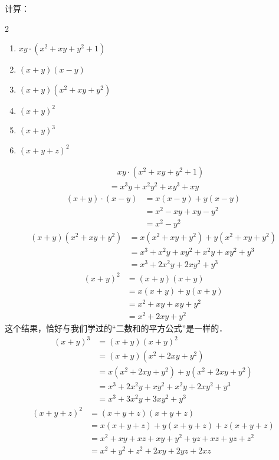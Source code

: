 \begin{example}
计算：
 \begin{multicols}{2}
\begin{enumerate}
    \item $xy\cdot (x^2+xy+y^2+1)$
    \item $(x+y)(x-y)$
    \item $(x+y)(x^2+xy+y^2)$
    \item $(x+y)^2$
    \item $(x+y)^3$
    \item $(x+y+z)^2$
\end{enumerate}
    \end{multicols}

\end{example}

\begin{solution}
\begin{align*}
     &\quad    xy\cdot (x^2+xy+y^2+1)\\
     &=x^3y+x^2y^2+xy^3+xy \tag{分配律}
    \end{align*}
\begin{align*}
        (x+y)\cdot (x-y)&=x(x-y)+y(x-y) \tag{分配律}\\
        &=x^2-xy+xy-y^2  \\
        &=x^2-y^2\tag{合并同类项法则}
    \end{align*}
\begin{align*}
        (x+y)(x^2+xy+y^2)&= x(x^2+xy+y^2)+y(x^2+xy+y^2)\\
        &=x^3+x^2y+xy^2+x^2y+xy^2+y^3\\
        &=x^3+2x^2y+2xy^2+y^3
    \end{align*}
\begin{align*}
        (x+y)^2&=(x+y)(x+y)\\
        &=x(x+y)+y(x+y)\\
        &=x^2+xy+xy+y^2\\
        &=x^2+2xy+y^2
    \end{align*}
    这个结果，恰好与我们学过的“二数和的平方公式”是一样的．
\begin{align*}
        (x+y)^3&=(x+y)(x+y)^2\\
        &=(x+y)(x^2+2xy+y^2)\\
        &=x(x^2+2xy+y^2)+y(x^2+2xy+y^2)\\
        &=x^3+2x^2y+xy^2+x^2y+2xy^2+y^3     \\
        &=x^3+3x^2y+3xy^2+y^3
    \end{align*}
\begin{align*}
        (x+y+z)^2&=(x+y+z)(x+y+z)\\
        &=x(x+y+z)+y(x+y+z)+z(x+y+z)\\
        &=x^2+xy+xz+xy+y^2+yz+xz+yz+z^2\\
        &=x^2+y^2+z^2+2xy+2yz+2xz    \\
    \end{align*}
\end{solution}

